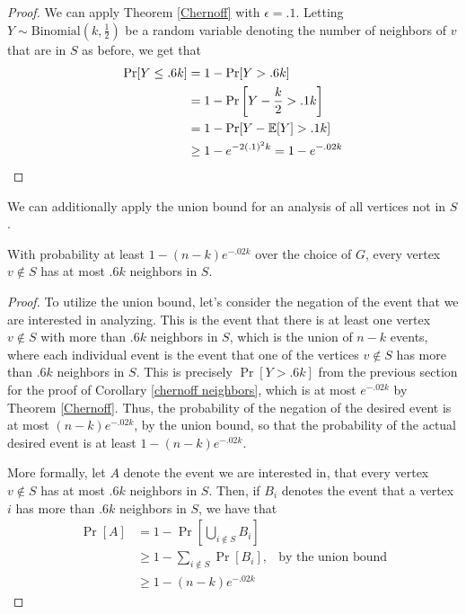 \documentclass{article}
\begin{document}
\begin{proof}
    We can apply Theorem \ref{Chernoff} with $\epsilon = .1$. Letting $Y \sim
    \text{Binomial}\left(k, \frac{1}{2}\right)$ be a
    random variable
    denoting the number of neighbors of $v$ that are in $S$ as before, we get that
    \begin{align*}
        \Pr[Y \leq .6k] &= 1 - \Pr[Y > .6k]
        \\
        &= 1 - \Pr\left[Y - \frac{k}{2} > .1k\right]
        \\
        &= 1 - \Pr[Y - \operatorname{\mathbb{E}}[Y] > .1k]
        \\
        &\geq 1 - e^{-2(.1)^{2}k} = 1 - e^{-.02k}
    \end{align*}
\end{proof}

We can additionally apply the union bound for an analysis of all vertices not
in $S$.

\begin{corollary}
    With probability at least $1 - (n - k) e^{-.02k}$ over the choice of $G$,
    every vertex $v \notin S$ has at most $.6k$ neighbors in $S$.
\end{corollary}

\begin{proof}
    To utilize the union bound, let's consider the negation of the event that
    we are interested in analyzing. This is the event that there is at least
    one vertex $v \notin S$ with more than $.6k$ neighbors in $S$, which is the
    union of $n - k$ events, where each individual event is the event that one
    of the vertices $v \notin S$ has more than $.6k$ neighbors in $S$. This is
    precisely $\Pr[Y > .6k]$ from the previous section for the proof of
    Corollary \ref{chernoff neighbors}, which is at most $e^{-.02k}$ by Theorem
    \ref{Chernoff}. Thus, the probability of the negation of the desired event is at
    most $(n - k) e^{-.02k}$, by the union bound, so that the probability of the actual desired
    event is at least $1 - (n - k) e^{-.02k}$.

    More formally, let $A$ denote the event we are interested in, that every
    vertex $v \notin S$ has at most $.6k$ neighbors in $S$. Then, if $B_{i}$
    denotes the event that a vertex $i$ has more than $.6k$ neighbors
    in $S$, we have that
    \begin{align*}
        \Pr[A] &= 1 - \Pr\left[\bigcup_{i \notin S} B_{i}\right]
        \\
        &\geq 1 - \sum_{i \notin S} \Pr[B_{i}], & \text{by the union bound}
        \\
        &\geq 1 - (n - k) e^{-.02k}
    \end{align*}
\end{proof}
\end{document}
